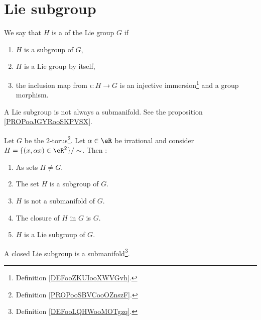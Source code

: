\section{Lie subgroup}

\begin{definition}        \label{DEFooGCHDooHUMSju}
	We say that \( H\) is a  of the Lie group \( G\) if
	\begin{enumerate}
		\item
		      \( H\) is a subgroup of \( G\),
		\item
		      \( H\) is a Lie group by itself,
		\item
		      the inclusion map from \( \iota\colon H\to G\) is an injective immersion\footnote{Definition \ref{DEFooZKUIooXWVGvh}.} and a group morphism.
	\end{enumerate}
\end{definition}

\begin{remark}
	A Lie subgroup is not always a submanifold. See the proposition \ref{PROPooJGYRooSKPVSX}.
\end{remark}

\begin{proposition}        \label{PROPooJGYRooSKPVSX}
	Let \( G\) be the \( 2\)-torus\footnote{Definition \ref{PROPooSBVCooOZnszF}.}. Let \( \alpha\in \eR\) be irrational and consider \( H=\{ (x,\alpha x)\in \eR^2 \}/\sim\). Then :
	\begin{enumerate}
		\item
		      As sets \( H\neq G\).
		\item
		      The set \( H\) is a subgroup of \( G\).
		\item
		      \( H\) is not a submanifold of \( G\).
		\item
		      The closure of \( H\) in \( G\) is \( G\).
		\item
		      \( H\) is a Lie subgroup of \( G\).
	\end{enumerate}
\end{proposition}


\begin{proposition}     \label{PROPooFXZJooCOFXZX}
	A closed Lie subgroup is a submanifold\footnote{Definition \ref{DEFooLQHWooMOTgzq}.}.
\end{proposition}

